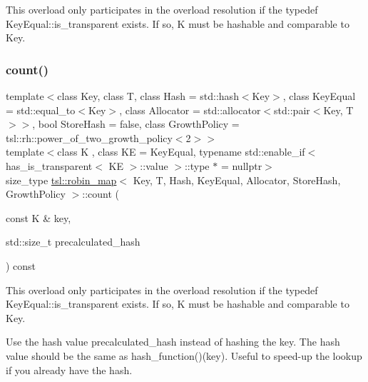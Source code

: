 This overload only participates in the overload resolution if the typedef Key\+Equal\+::is\+\_\+transparent exists. If so, K must be hashable and comparable to Key. \mbox{\label{classtsl_1_1robin__map_ad62bf9929897b8147abaa0de8a62599a}} 
\subsubsection{\texorpdfstring{count()}{count()}\hspace{0.1cm}{\footnotesize\ttfamily [3/3]}}
{\footnotesize\ttfamily template$<$class Key, class T, class Hash = std\+::hash$<$\+Key$>$, class Key\+Equal = std\+::equal\+\_\+to$<$\+Key$>$, class Allocator = std\+::allocator$<$std\+::pair$<$\+Key, T$>$$>$, bool Store\+Hash = false, class Growth\+Policy = tsl\+::rh\+::power\+\_\+of\+\_\+two\+\_\+growth\+\_\+policy$<$2$>$$>$ \\
template$<$class K , class KE  = Key\+Equal, typename std\+::enable\+\_\+if$<$ has\+\_\+is\+\_\+transparent$<$ K\+E $>$\+::value $>$\+::type $\ast$  = nullptr$>$ \\
size\+\_\+type \mbox{\hyperlink{classtsl_1_1robin__map}{tsl\+::robin\+\_\+map}}$<$ Key, T, Hash, Key\+Equal, Allocator, Store\+Hash, Growth\+Policy $>$\+::count (\begin{DoxyParamCaption}\item[{const K \&}]{key,  }\item[{std\+::size\+\_\+t}]{precalculated\+\_\+hash }\end{DoxyParamCaption}) const\hspace{0.3cm}{\ttfamily [inline]}}





This overload only participates in the overload resolution if the typedef Key\+Equal\+::is\+\_\+transparent exists. If so, K must be hashable and comparable to Key.

Use the hash value \textquotesingle{}precalculated\+\_\+hash\textquotesingle{} instead of hashing the key. The hash value should be the same as hash\+\_\+function()(key). Useful to speed-\/up the lookup if you already have the hash. \mbox{\label{classtsl_1_1robin__map_a2bed728f16977c4eb16251727fa14090}} 
